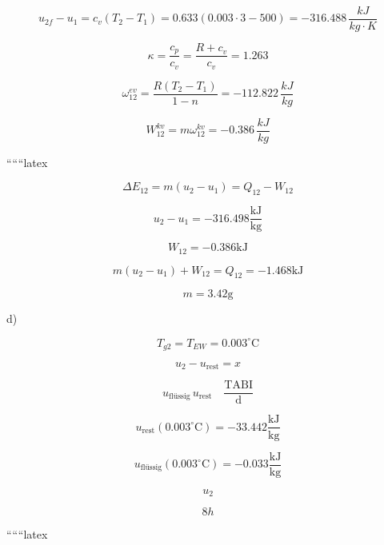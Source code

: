 \[
u_{2f} - u_1 = c_v (T_2 - T_1) = 0.633 (0.003 \cdot 3 - 500) = -316.488 \, \frac{kJ}{kg \cdot K}
\]

\[
\kappa = \frac{c_p}{c_v} = \frac{R + c_v}{c_v} = 1.263
\]

\[
\omega_{12}^{ev} = \frac{R (T_2 - T_1)}{1 - n} = -112.822 \, \frac{kJ}{kg}
\]

\[
W_{12}^{kv} = m \omega_{12}^{kv} = -0.386 \, \frac{kJ}{kg}
\]

``````latex


\[
\Delta E_{12} = m(u_2 - u_1) = Q_{12} - W_{12}
\]

\[
u_2 - u_1 = -316.498 \frac{\text{kJ}}{\text{kg}}
\]

\[
W_{12} = -0.386 \text{kJ}
\]

\[
m(u_2 - u_1) + W_{12} = Q_{12} = -1.468 \text{kJ}
\]

\[
m = 3.42 \text{g}
\]

d)

\[
T_{g2} = T_{EW} = 0.003^\circ \text{C}
\]

\[
u_2 - u_{\text{rest}} = x
\]

\[
u_{\text{flüssig}} \, u_{\text{rest}} \quad \frac{\text{TABI}}{\text{d}}
\]

\[
u_{\text{rest}} (0.003^\circ \text{C}) = -33.442 \frac{\text{kJ}}{\text{kg}}
\]

\[
u_{\text{flüssig}} (0.003^\circ \text{C}) = -0.033 \frac{\text{kJ}}{\text{kg}}
\]

\[
u_2
\]

\[
8h
\]

``````latex


